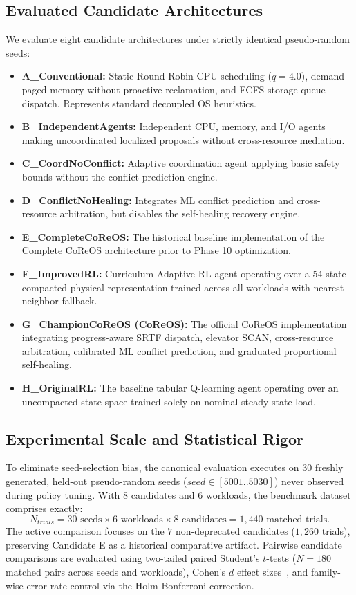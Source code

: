 \documentclass[conference]{IEEEtran}
\begin{document}
\subsection{Evaluated Candidate Architectures}
We evaluate eight candidate architectures under strictly identical pseudo-random seeds:
\begin{itemize}
    \item \textbf{A\_Conventional:} Static Round-Robin CPU scheduling ($q=4.0$), demand-paged memory without proactive reclamation, and FCFS storage queue dispatch. Represents standard decoupled OS heuristics.
    \item \textbf{B\_IndependentAgents:} Independent CPU, memory, and I/O agents making uncoordinated localized proposals without cross-resource mediation.
    \item \textbf{C\_CoordNoConflict:} Adaptive coordination agent applying basic safety bounds without the conflict prediction engine.
    \item \textbf{D\_ConflictNoHealing:} Integrates ML conflict prediction and cross-resource arbitration, but disables the self-healing recovery engine.
    \item \textbf{E\_CompleteCoReOS:} The historical baseline implementation of the Complete CoReOS architecture prior to Phase 10 optimization.
    \item \textbf{F\_ImprovedRL:} Curriculum Adaptive RL agent operating over a 54-state compacted physical representation trained across all workloads with nearest-neighbor fallback.
    \item \textbf{G\_ChampionCoReOS (CoReOS):} The official CoReOS implementation integrating progress-aware SRTF dispatch, elevator SCAN, cross-resource arbitration, calibrated ML conflict prediction, and graduated proportional self-healing.
    \item \textbf{H\_OriginalRL:} The baseline tabular Q-learning agent operating over an uncompacted state space trained solely on nominal steady-state load.
\end{itemize}

\subsection{Experimental Scale and Statistical Rigor}
To eliminate seed-selection bias, the canonical evaluation executes on $30$ freshly generated, held-out pseudo-random seeds ($seed \in [5001..5030]$) never observed during policy tuning. With $8$ candidates and $6$ workloads, the benchmark dataset comprises exactly:
\begin{equation}
    N_{trials} = 30 \text{ seeds} \times 6 \text{ workloads} \times 8 \text{ candidates} = 1,440 \text{ matched trials}.
\end{equation}
The active comparison focuses on the $7$ non-deprecated candidates ($1,260$ trials), preserving Candidate E as a historical comparative artifact. Pairwise candidate comparisons are evaluated using two-tailed paired Student's $t$-tests ($N=180$ matched pairs across seeds and workloads), Cohen's $d$ effect sizes~\cite{cohen1988statistical}, and family-wise error rate control via the Holm-Bonferroni correction.
\end{document}
